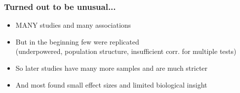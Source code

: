 \documentclass[xcolor=pdftex,dvipsnames,table,10pt]{beamer}
\begin{document}
\begin{frame}
  \frametitle{Turned out to be unusual...}
\begin{itemize}
\item MANY studies and many associations%
\item But in the beginning few were replicated\\(underpowered, population structure, insufficient corr. for multiple tests)
\item So later studies have many more samples and are much stricter 
\item And most found small effect sizes and limited biological insight
\end{itemize}
\end{frame}
\end{document}
